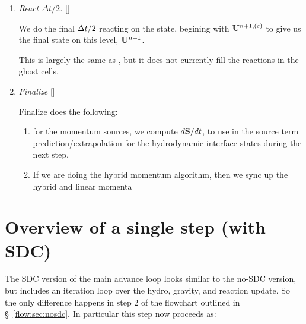 \begin{enumerate}


\item {\em React $\Delta t/2$.} []

  We do the final $\Delta t/2$ reacting on the state, begining with ${\bf U}^{n+1,(c)}$ to
  give us the final state on this level, ${\bf U}^{n+1}$.

  This is largely the same as , but
  it does not currently fill the reactions in the ghost cells. 

\item \label{strang:finalize} {\em Finalize} []

  Finalize does the following:
  \begin{enumerate}
  \item for the momentum sources, we compute $d{\bf S}/dt$, to use in the
    source term prediction/extrapolation for the hydrodynamic
    interface states during the next step.

  \item If we are doing the hybrid momentum algorithm, then we sync up
    the hybrid and linear momenta
  \end{enumerate}

\end{enumerate}


\section{Overview of a single step (with SDC)}

The SDC version of the main advance loop looks similar to the no-SDC
version, but includes an iteration loop over the hydro, gravity, and
reaction update.  So the only difference happens in step 2 of the
flowchart outlined in \S~\ref{flow:sec:nosdc}.  In particular this
step now proceeds as:

